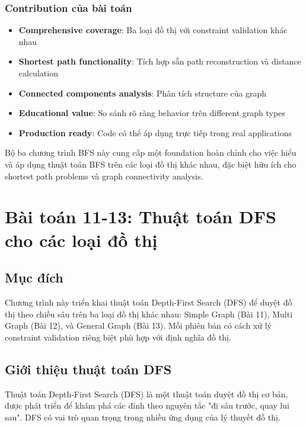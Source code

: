 \documentclass[12pt]{article}
\begin{document}
\subsubsection*{Contribution của bài toán}
\begin{itemize}
    \item \textbf{Comprehensive coverage}: Ba loại đồ thị với constraint validation khác nhau
    \item \textbf{Shortest path functionality}: Tích hợp sẵn path reconstruction và distance calculation
    \item \textbf{Connected components analysis}: Phân tích structure của graph
    \item \textbf{Educational value}: So sánh rõ ràng behavior trên different graph types
    \item \textbf{Production ready}: Code có thể áp dụng trực tiếp trong real applications
\end{itemize}

Bộ ba chương trình BFS này cung cấp một foundation hoàn chỉnh cho việc hiểu và áp dụng thuật toán BFS trên các loại đồ thị khác nhau, đặc biệt hữu ích cho shortest path problems và graph connectivity analysis.


\section*{Bài toán 11-13: Thuật toán DFS cho các loại đồ thị}

\subsection*{Mục đích}
Chương trình này triển khai thuật toán Depth-First Search (DFS) để duyệt đồ thị theo chiều sâu trên ba loại đồ thị khác nhau: Simple Graph (Bài 11), Multi Graph (Bài 12), và General Graph (Bài 13). Mỗi phiên bản có cách xử lý constraint validation riêng biệt phù hợp với định nghĩa đồ thị.

\subsection*{Giới thiệu thuật toán DFS}

Thuật toán Depth-First Search (DFS) là một thuật toán duyệt đồ thị cơ bản, được phát triển để khám phá các đỉnh theo nguyên tắc "đi sâu trước, quay lui sau". DFS có vai trò quan trọng trong nhiều ứng dụng của lý thuyết đồ thị.
\end{document}
